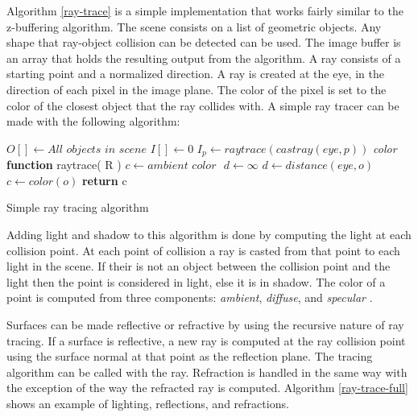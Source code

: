\documentclass[11pt,a4paper,oneside]{article}
\begin{document}
Algorithm \ref{ray-trace} is a simple implementation that works fairly similar to the z-buffering algorithm.  The scene consists on a list of geometric  objects.  Any shape that ray-object collision can be detected can be used.  The image buffer is an array that holds the resulting output from the algorithm.  A ray consists of a starting point and a normalized direction.  A ray is created at the eye, in the direction of each pixel in the image plane.  The color of the pixel is set to the color of the closest object that the ray collides with.  A simple ray tracer can be made with the following algorithm:

\begin{algorithm}[H]
\begin{algorithmic}[1]
\STATE $O[ ] \gets \textit{All objects in scene}$ 
\STATE $I[] \gets 0$ 
\STATE
{}
	\STATE $I_{p} \gets raytrace( castray( eye, p ))$
\ENDFOR
\STATE 
\STATE \textit{color} \textbf{function} raytrace(  R )
	\STATE $c  \gets \textit{ambient color } $
	\STATE $d \gets \infty $
				\STATE $d \gets distance( \textit{eye}, o )$
				\STATE $c \gets color( o )$
			\ENDIF
		\ENDIF
	\ENDFOR
	\STATE \textbf{return} c

\end{algorithmic}
\caption{Simple ray tracing algorithm}
\label{ray-trace}
\end{algorithm}

Adding light and shadow to this algorithm is done by computing the light at each collision point.  At each point of collision a ray is casted from that point to each light in the scene.  If their is not an object between the collision point and the light then the point is considered in light, else it is in shadow.  The color of a point is computed from three components: \textit{ambient}, \textit{diffuse}, and \textit{specular} \cite{kalinini:2008}.

Surfaces can be made reflective or refractive by using the recursive nature of ray tracing.  If a surface is reflective, a new ray is computed at the ray collision point using the surface normal at that point as the reflection plane.  The tracing algorithm can be called with the ray.  Refraction is handled in the same way with the exception of the way the refracted ray is computed.  Algorithm \ref{ray-trace-full} shows an example of lighting, reflections, and refractions.  
  
\end{document}
